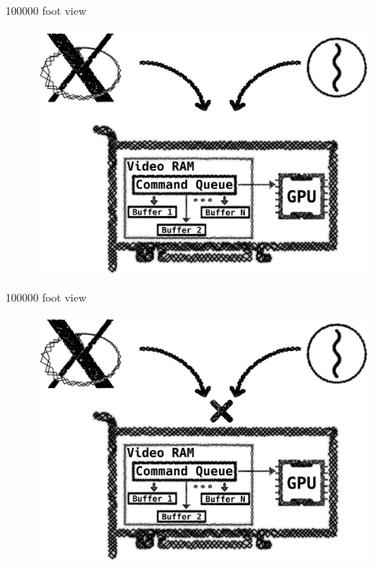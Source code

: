\documentclass[10pt, compress, aspectratio=169]{beamer}
\begin{document}
\begin{frame}{100000 foot view}
  \begin{figure}
    \centering
    \includegraphics[width=\linewidth,
                     height=0.8\textheight,
                     keepaspectratio]{no_drm_3}
  \end{figure}
\end{frame}

\begin{frame}{100000 foot view}
  \begin{figure}
    \centering
    \includegraphics[width=\linewidth,
                     height=0.8\textheight,
                     keepaspectratio]{no_drm}
  \end{figure}
\end{frame}
\end{document}
